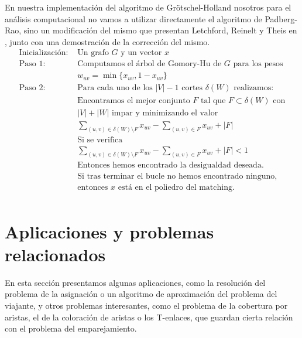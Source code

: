 \documentclass[twoside,a4paper,openright,12pt]{book}
\begin{document}
En nuestra implementación del algoritmo de Grötschel-Holland nosotros para el análisis computacional no vamos a utilizar directamente el algoritmo de Padberg-Rao, sino un modificación del mismo que presentan Letchford, Reinelt y Theis en \cite{adam}, junto con una demostración de la corrección del mismo.
\begin{align*}
\text{Inicialización: }&\text{Un grafo $G$ y un vector $x$}\\
\text{Paso 1: }&\text{Computamos el árbol de Gomory-Hu de $G$ para los pesos}\\
& w_{uv} = \min\{x_{uv},1-x_{uv}\}\\
\text{Paso 2: }&\text{Para cada uno de los $|V|-1$ cortes $\delta(W)$ realizamos:}\\
&\text{Encontramos el mejor conjunto $F$ tal que $F\subset \delta(W)$ con}\\
&\text{$|V|+|W|$ impar y minimizando el valor}\\
&\sum_{(u,v)\in \delta(W)\setminus F}x_{uv} - \sum_{(u,v)\in F}x_{uv} + |F|\\
&\text{Si se verifica}\\
&\sum_{(u,v)\in \delta(W)\setminus F}x_{uv} - \sum_{(u,v)\in F}x_{uv} +|F|<1\\
& \text{Entonces hemos encontrado la desigualdad deseada.}\\
&\text{Si tras terminar el bucle no hemos encontrado ninguno,}\\
&\text{entonces $x$ está en el poliedro del matching.}\\
\end{align*}


\section{Aplicaciones y problemas relacionados}
En esta sección presentamos algunas aplicaciones, como la resolución del problema de la asignación o un algoritmo de aproximación del problema del viajante, y otros problemas interesantes, como el problema de la cobertura por aristas, el de la coloración de aristas o los T-enlaces, que guardan cierta relación con el problema del emparejamiento.
\end{document}
